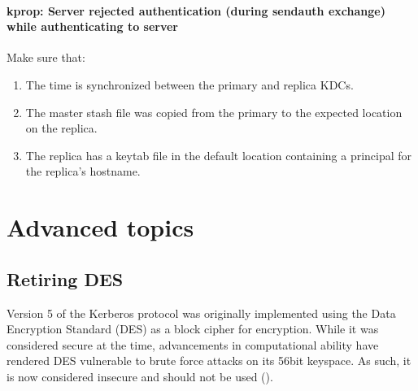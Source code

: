 \documentclass[letterpaper,10pt,english]{sphinxmanual}
\begin{document}
\subsubsection{kprop: Server rejected authentication (during sendauth exchange) while authenticating to server}
\label{\detokenize{admin/troubleshoot:kprop-server-rejected-authentication-during-sendauth-exchange-while-authenticating-to-server}}\label{\detokenize{admin/troubleshoot:kprop-sendauth-exchange}}
\sphinxAtStartPar
Make sure that:
\begin{enumerate}
%
\item {} 
\sphinxAtStartPar
The time is synchronized between the primary and replica KDCs.

\item {} 
\sphinxAtStartPar
The master stash file was copied from the primary to the expected
location on the replica.

\item {} 
\sphinxAtStartPar
The replica has a keytab file in the default location containing a
 principal for the replica’s hostname.

\end{enumerate}

\sphinxstepscope


\chapter{Advanced topics}
\label{\detokenize{admin/advanced/index:advanced-topics}}\label{\detokenize{admin/advanced/index::doc}}
\sphinxstepscope


\section{Retiring DES}
\label{\detokenize{admin/advanced/retiring-des:retiring-des}}\label{\detokenize{admin/advanced/retiring-des:id1}}\label{\detokenize{admin/advanced/retiring-des::doc}}
\sphinxAtStartPar
Version 5 of the Kerberos protocol was originally implemented using
the Data Encryption Standard (DES) as a block cipher for encryption.
While it was considered secure at the time, advancements in computational
ability have rendered DES vulnerable to brute force attacks on its 56\sphinxhyphen{}bit
keyspace.  As such, it is now considered insecure and should not be
used ().
\end{document}
